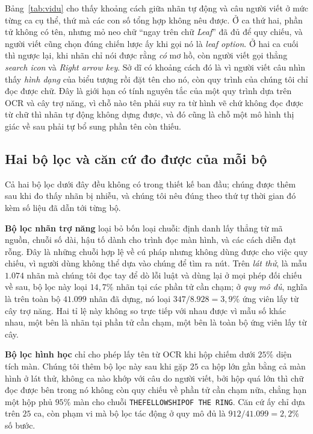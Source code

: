 \documentclass[12pt,a4paper,onecolumn]{article}
\newcommand{\ôvuông}[2]{\tikz[baseline=-0.45ex]{\draw[#1,line width=0.9pt,#2] (0,0) rectangle (0.34,0.18);}}
\newcommand{\code}[1]{{\small\texttt{#1}}}
\begin{document}
Bảng~\ref{tab:vidu} cho thấy khoảng cách giữa nhãn tự động và câu người viết ở mức từng
ca cụ thể, thứ mà các con số tổng hợp không nêu được. Ở ca thứ hai, phần tử không có tên, nhưng mỏ neo chữ ``ngay trên chữ
\emph{Leaf}'' đã đủ để quy chiếu, và người viết cũng chọn đúng chiến lược ấy khi gọi nó là
\emph{leaf option}. Ở hai ca cuối thì ngược lại, khi nhãn chỉ nói được rằng \emph{có} mơ hồ, còn người viết
gọi thẳng \emph{search icon} và \emph{Right arrow key}. Sở dĩ có
khoảng cách đó là vì người viết câu nhìn thấy \emph{hình dạng} của biểu tượng rồi đặt tên
cho nó, còn quy trình của chúng tôi chỉ đọc được chữ. Đây là giới hạn có tính nguyên tắc của một quy trình dựa trên OCR và cây trợ năng, vì chỗ
nào tên phải suy ra từ hình vẽ chứ không đọc được từ chữ thì nhãn tự động không dựng được,
và đó cũng là chỗ một mô hình thị giác về sau phải tự bổ sung phần tên còn thiếu.

\subsection{Hai bộ lọc và căn cứ đo được của mỗi bộ}
\label{sec:cong}

Cả hai bộ lọc dưới đây đều không có trong thiết kế ban đầu; chúng được thêm sau khi đo thấy
nhãn bị nhiễu, và chúng tôi nêu đúng theo thứ tự thời gian đó kèm số liệu đã dẫn tới từng bộ.

\textbf{Bộ lọc nhãn trợ năng} loại bỏ bốn loại chuỗi: định danh lấy thẳng từ mã nguồn,
chuỗi số dài, hậu tố dành cho trình đọc màn hình, và các cách diễn đạt rỗng. Đây là những
chuỗi hợp lệ về cú pháp nhưng không dùng được cho việc quy chiếu, vì người dùng không thể
dựa vào chúng
để tìm ra nút. Trên \emph{lát thử}, là mẫu $1.074$ nhãn mà chúng tôi đọc tay để dò lỗi
luật và dùng lại ở mọi phép đối chiếu về sau, bộ lọc này loại $14{,}7\%$ nhãn tại các phần tử cần chạm; ở \emph{quy mô đủ}, nghĩa là trên toàn bộ $41.099$ nhãn đã dựng, nó loại
$347/8.928 = 3{,}9\%$ ứng viên lấy từ cây trợ năng. Hai
tỉ lệ này không so trực tiếp với nhau được vì mẫu số khác nhau, một bên là nhãn tại phần tử cần chạm, một bên là toàn bộ ứng viên lấy từ cây.

\textbf{Bộ lọc hình học} chỉ cho phép lấy tên từ OCR khi hộp chiếm dưới $25\%$ diện tích
màn. Chúng tôi thêm bộ lọc này sau khi gặp $25$ ca hộp lớn gần bằng cả màn hình ở lát thử,
không ca nào khớp với câu do người viết, bởi hộp quá lớn thì chữ đọc được bên trong nó
không còn quy chiếu về phần tử cần chạm nữa, chẳng hạn một hộp phủ $95\%$ màn cho chuỗi
\code{THEFELLOWSHIPOF THE RING}. Căn cứ ấy chỉ dựa trên $25$ ca, còn phạm vi mà bộ lọc tác
động ở quy mô đủ là $912/41.099 = 2{,}2\%$ số bước.
\end{document}
